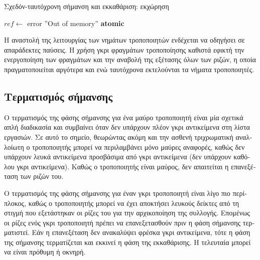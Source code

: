 \begin{greek}
\begin{algorithm}
  \caption{Σχεδόν-ταυτόχρονη σήμανση και εκκαθάριση: εκχώρηση}
  \label{alg:conc_3}
  \begin{algorithmic}[1]
      \State {}
      \State $ref \gets$  
        \State error ''Out of memory''
      \EndIf
      \State {}
    \EndFunction
    \Statex
      \State \textbf{atomic}
          \State {}
        \EndIf
      \EndWhile
    \EndFunction
  \end{algorithmic}
\end{algorithm}

Η αναστολή της λειτουργίας των νημάτων τροποποιητών ενδέχεται να οδηγήσει σε απαράδεκτες
παύσεις. Η χρήση γκρι φραγμάτων τροποποίησης καθιστά εφικτή την ενεργοποίηση των φραγμάτων και την 
αναβολή της εξέτασης όλων των ριζών, η οποία πραγματοποιείται αργότερα και ενώ ταυτόχρονα εκτελούνται 
τα νήματα τροποποιητές. 

\subsection{Τερματισμός σήμανσης}
Ο τερματισμός της φάσης σήμανσης για ένα μαύρο τροποποιητή είναι μία σχετικά απλή διαδικασία και 
συμβαίνει όταν δεν υπάρχουν πλέον γκρι αντικείμενα στη λίστα εργασιών. Σε αυτό το σημείο, θεωρώντας 
ακόμη και την ασθενή τριχρωματική αναλλοίωτη ο τροποποιητής μπορεί να περιλαμβάνει μόνο μαύρες 
αναφορές, καθώς δεν υπάρχουν λευκά αντικείμενα προσβάσιμα από γκρι αντικείμενα (δεν υπάρχουν καθόλου 
γκρι αντικείμενα). Καθώς ο τροποποιητής είναι μαύρος, δεν απαιτείται η επανεξέταση των ριζών του.

Ο τερματισμός της φάσης σήμανσης για έναν γκρι τροποποιητή είναι λίγο πιο περίπλοκος, καθώς ο 
τροποποιητής μπορεί να έχει αποκτήσει λευκούς δείκτες από τη στιγμή που εξετάστηκαν οι ρίζες του για 
την αρχικοποίηση της συλλογής. Επομένως οι ρίζες ενός γκρι τροποποιητή πρέπει να επανεξετασθούν πριν 
η φάση σήμανσης τερματιστεί. Εάν η επανεξέταση δεν ανακαλύψει φρέσκα γκρι αντικείμενα, τότε η φάση 
της σήμανσης τερματίζεται και εκκινεί η φάση της εκκαθάρισης. Η τελευταία μπορεί να είναι πρόθυμη ή 
οκνηρή. 


\end{greek}
